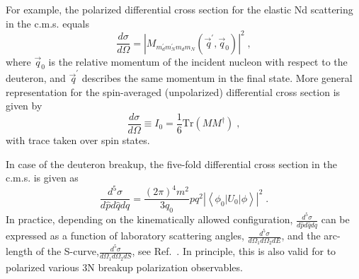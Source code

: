 For example, the polarized differential cross section for the elastic Nd scattering in the c.m.s. equals
\begin{equation}
\frac{d\sigma}{d\Omega} = |M_{m^{\prime}_{d}m^{\prime}_{N}m_{d}m_{N}}(\!\vec{\,q}^{\prime},\vec{q}_{0})|^{2}\;,
\end{equation}
where $\vec{q}_{0}$ is the relative momentum of the incident nucleon with respect to the deuteron, and $\!\vec{\, q}^{\prime}$ describes the same momentum in the final state. More general representation for the spin-averaged (unpolarized) differential cross section is given by 
\begin{equation}
\frac{d\sigma}{d\Omega} \equiv I_{0} = \frac{1}{6}\mathrm{Tr}(MM^{\dagger})\;,
\end{equation}
with trace taken over spin states.

In case of the deuteron breakup, the five-fold differential cross section in the c.m.s. is given as
\begin{equation}
\frac{d^{5}\sigma}{d\hat{p}d\hat{q}dq} = \frac{(2\pi)^{4}m^{2}}{3q_{0}}pq^{2}|\left<\phi_{0}|U_{0}|\phi\right>|^{2}\;.
\end{equation}
In practice, depending on the kinematically allowed configuration, $\frac{d^{5}\sigma}{d\hat{p}d\hat{q}dq}$ can be expressed as a function of laboratory scattering angles, $\frac{d^{5}\sigma}{d\Omega_{1}d\Omega_{2}dE}$, and the arc-length of the S-curve,$\frac{d^{5}\sigma}{d\Omega_{1}d\Omega_{2}dS}$, see Ref.~\cite{Glockle1996}. In principle, this is also valid for to polarized various 3N breakup  polarization observables.

